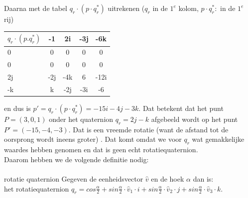 Daarna met de tabel  $  q_r\cdot (p\cdot q^*_r) $ uitrekenen  
\quad ($  q_r  $ in de $  1^e $ kolom, $  p\cdot q^*_r: $ in de $ 1^e $ rij)\\
\begin{center}
	\begin{tabular}{ | l || c | c |c |c |}
		\hline
		$ q_r\cdot (p.q^*_r) $ & -1 & 2i   & -3j & -6k \\ \hline \hline
		0    & 0 & 0   &   0        & 0  \\ \hline
		0    & 0 & 0   &   0        & 0  \\ \hline
		2j   & -2j &  -4k &   6     & -12i\\ \hline
		-k    & k  & -2j   & -3i   & -6\\ 
		\hline 
	\end{tabular}
\end{center}
en dus is $ p' = q_r\cdot (p\cdot q^*_r) =  -15i -4j -3k. $ Dat betekent dat het punt $ P = (3,0,1) $  onder het quaternion  $ q_r = 2j-k $ afgebeeld wordt op het punt $ P' = (-15, -4, -3). $ Dat is een vreemde rotatie (want de afstand tot de oorsprong wordt ineens groter) . Dat komt omdat we voor $ q_r $ wat gemakkelijke waardes hebben genomen en dat is geen echt rotatiequaternion.\\
Daarom hebben we de volgende definitie nodig:\\ \\
\mydef
{rotatie quaternion}
{Gegeven de eenheidsvector $\hat{v} $  en de  hoek $\alpha $ dan is:\\
	het rotatiequaternion \quad	
	$ q_r = cos\frac{\alpha}{2} + sin\frac{\alpha}{2} \cdot \hat{v}_1\cdot i
	+ sin\frac{\alpha}{2} \cdot \hat{v}_2\cdot j + sin\frac{\alpha}{2} \cdot \hat{v}_3\cdot k $.	    
}\\
\\
